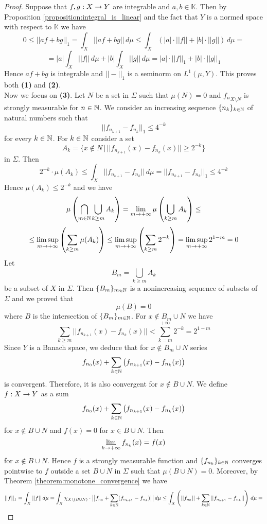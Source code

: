 \begin{proof}
Suppose that $f, g:X\rightarrow Y$ are integrable and $a, b\in \mathbb{K}$. Then by Proposition \ref{proposition:integral_is_linear} and the fact that $Y$ is a normed space with respect to $\mathbb{K}$ we have
$$0 \leq ||a f+ b g||_1 = \int_X||a f + b g||\,d\mu \leq \int_X\left(|a|\cdot ||f||+ |b|\cdot ||g||\right)\,d\mu= $$
$$= |a| \int_X||f||\,d\mu + |b| \int_X||g||\,d\mu = |a|\cdot ||f||_1+ |b|\cdot ||g||_1 $$
Hence $a f + b g$ is integrable and $||-||_1$ is a seminorm on $L^1(\mu,Y)$. This proves both \textbf{(1)} and \textbf{(2)}.\\
Now we focus on \textbf{(3)}. Let $N$ be a set in $\Sigma$ such that $\mu(N) = 0$ and ${f_n}_{X\setminus N}$ is strongly measurable for $n\in {\mathbb N}$. We consider an increasing sequence $\{n_k\}_{k\in {\mathbb N}}$ of natural numbers such that
$$||f_{n_{k+1}} - f_{n_k}||_1\leq 4^{-k}$$
for every $k\in {\mathbb N}$. For $k\in {\mathbb N}$ consider a set
$$A_k = \big\{x \not \in N\,\big|\,||f_{n_{k+1}}(x) - f_{n_k}(x)||\geq 2^{-k}\big\}$$
in $\Sigma$. Then
$$2^{-k}\cdot \mu(A_k)\leq \int_X||f_{n_{k+1}}-f_{n_k}||\,d\mu = ||f_{n_{k+1}}-f_{n_k}||_1\leq 4^{-k}$$
Hence $\mu(A_k)\leq 2^{-k}$ and we have
$$\mu\left(\bigcap_{m\in {\mathbb N}}\bigcup_{k\geq m}A_k\right) = \lim_{m\rightarrow +\infty} \mu\left(\bigcup_{k\geq m}A_k\right)\leq $$
$$\leq \limsup_{m\rightarrow +\infty}\left(\sum_{k\geq m}\mu(A_k)\right) \leq \limsup_{m\rightarrow +\infty}\left(\sum_{k\geq m}2^{-k}\right) = \limsup_{m\rightarrow +\infty} 2^{1-m} = 0$$
Let
$$B_m = \bigcup_{k\geq m}A_k$$
be a subset of $X$ in $\Sigma$. Then $\{B_m\}_{m\in {\mathbb N}}$ is a nonincreasing sequence of subsets of $\Sigma$ and we proved that
$$\mu\left(B\right)=  0$$
where $B$ is the intersection of $\{B_m\}_{m\in {\mathbb N}}$. For $x\not \in B_m\cup N$ we have
$$\sum_{k\geq m}||f_{n_{k+1}}(x) - f_{n_k}(x)|| < \sum_{k=m}^{+\infty}2^{-k} = 2^{1-m}$$
Since $Y$ is a Banach space, we deduce that for $x\not \in B_m\cup N$ series
$$f_{n_0}(x) + \sum_{k\in {\mathbb N}}\left(f_{n_{k+1}}(x) - f_{n_k}(x)\right)$$
is convergent. Therefore, it is also convergent for $x\not \in B\cup N$. We define $f:X\rightarrow Y$ as a sum
$$f_{n_0}(x) + \sum_{k\in {\mathbb N}}\left(f_{n_{k+1}}(x) - f_{n_k}(x)\right)$$
for $x\not \in B\cup N$ and $f(x) = 0$ for $x\in B\cup N$. Then
$$\lim_{k\rightarrow +\infty}f_{n_k}(x) = f(x)$$
for $x \not \in B\cup N$. Hence $f$ is a strongly measurable function and $\{f_{n_k}\}_{k\in {\mathbb N}}$ converges pointwise to $f$ outside a set $B\cup N$ in $\Sigma$ such that $\mu(B\cup N) = 0$. Moreover, by Theorem \ref{theorem:monotone_convergence} we have
$$||f||_1 = \int_X||f||\,d\mu = \int_X\chi_{X\setminus \left(B\cup N\right)}\cdot \big|\big|f_{n_0} + \sum_{k\in {\mathbb N}}(f_{n_{k+1}} - f_{n_k})\big|\big|\,d\mu \leq \int_X\left(||f_{n_0}|| + \sum_{k\in {\mathbb N}}||f_{n_{k+1}}-f_{n_k}||\right)\,d\mu = $$

\end{proof}
